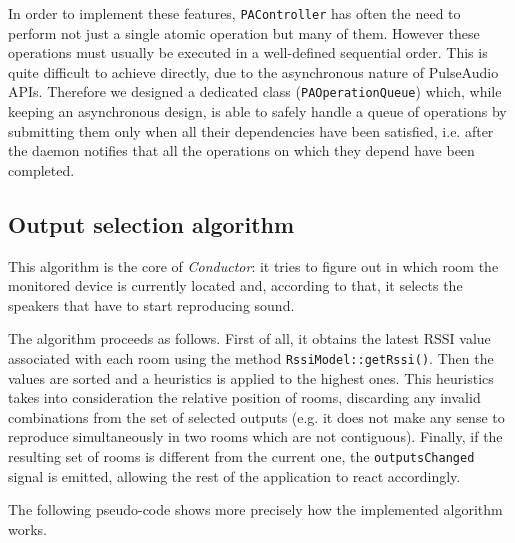 \documentclass[conference]{IEEEtran}
\begin{document}
In order to implement these features, \texttt{PAController} has often the need to perform not just a single atomic operation but many of them. However these operations must usually be executed in a well-defined sequential order. This is quite difficult to achieve directly, due to the asynchronous nature of PulseAudio APIs. Therefore we designed a dedicated class (\texttt{PAOperationQueue}) which, while keeping an asynchronous design, is able to safely handle a queue of operations by submitting them only when all their dependencies have been satisfied, i.e. after the daemon notifies that all the operations on which they depend have been completed.

\subsection{Output selection algorithm}
This algorithm is the core of \textsl{Conductor}: it tries to figure out in which room the monitored device is currently located and, according to that, it selects the speakers that have to start reproducing sound.

The algorithm proceeds as follows. First of all, it obtains the latest RSSI value associated with each room using the method \texttt{RssiModel::getRssi()}. Then the values are sorted and a heuristics is applied to the highest ones. This heuristics takes into consideration the relative position of rooms, discarding any invalid combinations from the set of selected outputs (e.g. it does not make any sense to reproduce simultaneously in two rooms which are not contiguous). Finally, if the resulting set of rooms is different from the current one, the \texttt{outputsChanged} signal is emitted, allowing the rest of the application to react accordingly.

The following pseudo-code shows more precisely how the implemented algorithm works.
\end{document}
